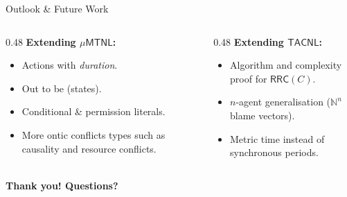 \documentclass[9pt,aspectratio=169]{beamer}
\newcommand{\logic}[1]{\ensuremath{\mathsf{#1}}\xspace}
\newcommand{\TDDLfm}{\logic{\mu MTNL}}
\newcommand{\cDL}{\logic{TACNL}}
\newcommand{\rrcs}[1]{\ensuremath{\mathsf{RRC}\!\left(#1\right)}\xspace}
\begin{document}
\begin{frame}{Outlook \& Future Work}
\begin{columns}[T]
\begin{column}{0.48\textwidth}
  \textbf{Extending $\TDDLfm$:}
  \begin{itemize}
    \item Actions with \emph{duration}.
    \item Out to be (states).
    \item Conditional \& permission literals.
    \item More ontic conflicts types such as causality and resource conflicts.
  \end{itemize}
\end{column}
\begin{column}{0.48\textwidth}
  \textbf{Extending \cDL:}
  \begin{itemize}
    \item Algorithm and complexity proof for $\rrcs{C}$.
    \item $n$-agent generalisation ($\mathbb{N}^n$ blame vectors).
    \item Metric time instead of synchronous periods.
  \end{itemize}
\end{column}
\end{columns}

\vspace{5mm}
\centering

\vspace{4mm}
{\Large\bfseries Thank you! \quad Questions?}
\end{frame}

\appendix
\end{document}
